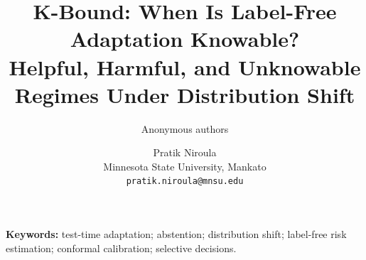 \documentclass[11pt,twocolumn]{article}
\title{\vspace{-1.5em}\textbf{K-Bound: When Is Label-Free Adaptation Knowable?}\\[-1pt]
\large Helpful, Harmful, and Unknowable Regimes Under Distribution Shift}
\author{Anonymous authors}
\author{Pratik Niroula\\
  \small Minnesota State University, Mankato\\
  \small \texttt{pratik.niroula@mnsu.edu}}
\date{}
\theoremstyle{plain}
\theoremstyle{definition}
\theoremstyle{remark}
\begin{document}
\maketitle

\begin{abstract}

\end{abstract}

\noindent\textbf{Keywords:} test-time adaptation; abstention; distribution shift;
label-free risk estimation; conformal calibration; selective decisions.



{\footnotesize}

\clearpage

\end{document}
